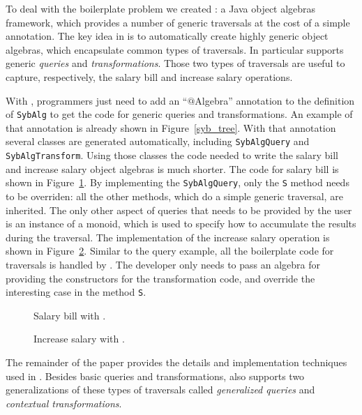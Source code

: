 To deal with the boilerplate problem we created \Name: a Java object
algebras framework, which provides a number of generic traversals at
the cost of a simple annotation. The key idea in \name is to
automatically create highly generic object algebras, which encapsulate
common types of traversals. In particular \name supports generic
\emph{queries} and \emph{transformations}. Those two types of
traversals are useful to capture, respectively, the salary bill and
increase salary operations.

With \Name, programmers just need to add an ``$@$Algebra'' annotation
to the definition of \lstinline{SybAlg} to get the code for generic
queries and transformations. An example of that annotation is already
shown in Figure~\ref{syb_tree}. With that annotation several classes
are generated automatically, including \lstinline{SybAlgQuery} and
\lstinline{SybAlgTransform}. Using those classes the code needed to
write the salary bill and increase salary object algebras is much
shorter. The code for salary bill is shown in
Figure~\ref{query_with_oaframework}. By implementing the
\lstinline{SybAlgQuery}, only the \lstinline{S} method needs to be
overriden: all the other methods, which do a simple generic traversal,
are inherited. The only other aspect of queries that needs to be
provided by the user is an instance of a monoid, which is used to
specify how to accumulate the results during the traversal. The
implementation of the increase salary operation is shown in
Figure~\ref{transform_with_oaframework}. Similar to the query example,
all the boilerplate code for traversals is handled by \Name. The
developer only needs to pass an algebra for providing the constructors
for the transformation code, and override the interesting case in the
method \lstinline{S}. 

\begin{figure}[tb]
\vspace{-.1in}
\caption{Salary bill with \Name.}
\label{query_with_oaframework}
\end{figure}
  
\begin{figure}[tb]
\vspace{-.1in}
\caption{Increase salary with \Name.}
\label{transform_with_oaframework}
\end{figure}


The remainder of the paper provides the details and implementation
techniques used in \Name. Besides basic queries and transformations,
\name also supports two generalizations of these types of traversals 
called \emph{generalized queries} and \emph{contextual transformations}.
